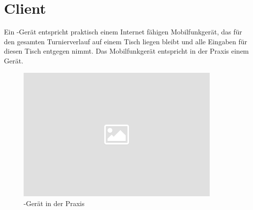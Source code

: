 \section{Client}

\noindent
Ein \cli-Gerät entspricht praktisch einem Internet fähigen Mobilfunkgerät, das für den gesamten Turnierverlauf auf einem Tisch liegen bleibt und alle Eingaben für diesen Tisch entgegen nimmt. Das Mobilfunkgerät entspricht in der Praxis einem \bbm Gerät.

\noindent
\begin{figure}[ht]
	\centering
  \includegraphics[width=10cm]{pictures/placeholder.png}
	\caption{\cli-Gerät in der Praxis}
	\label{pic/cli}
\end{figure}
